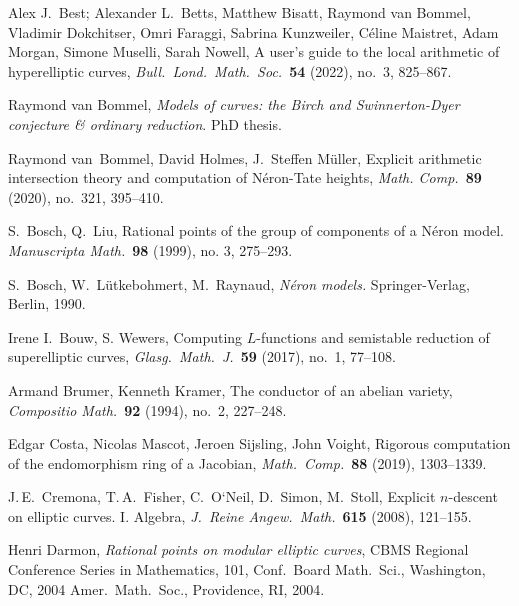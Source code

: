 \documentclass[12pt]{article}
\theoremstyle{definition}
\numberwithin{equation}{subsection}
\begin{document}
\begin{thebibliography}{HyperUser}				%

    Alex J.\ Best; Alexander L.\ Betts, Matthew Bisatt, Raymond van Bommel, Vladimir Dokchitser, Omri Faraggi, Sabrina Kunzweiler, C\'eline Maistret, Adam Morgan, Simone Muselli, Sarah Nowell,
    A user's guide to the local arithmetic of hyperelliptic curves,
    {\em Bull.\ Lond.\ Math.\ Soc.}\ {\bf 54} (2022), no.~3, 825--867.

    Raymond van Bommel,
    {\em Models of curves: the Birch and Swinnerton-Dyer conjecture \& ordinary reduction}.
    PhD thesis.

    Raymond van~Bommel, David Holmes, J.\ Steffen M\"uller,
    Explicit arithmetic intersection theory and computation of N\'eron-Tate heights,
    {\em Math. Comp.}\ {\bf 89} (2020), no.~321, 395--410.

	S.\ Bosch, Q.\ Liu, 
	Rational points of the group of components of a N\'eron model.
	{\em Manuscripta Math.}\ {\bf 98} (1999), no. 3, 275--293.

	S.\ Bosch, W.\, L\"utkebohmert, M.\ Raynaud,
	\emph{N\'eron models.}
	Springer-Verlag, Berlin, 1990.

    Irene I.\ Bouw, S. Wewers,
    Computing $L$-functions and semistable reduction of superelliptic curves,
    {\em Glasg.\ Math.\ J.}\ {\bf 59} (2017), no.~1, 77--108.

    Armand Brumer, Kenneth Kramer,
    The conductor of an abelian variety,
    {\em Compositio Math.}\ {\bf 92} (1994), no.~2, 227--248.

    Edgar Costa, Nicolas Mascot, Jeroen Sijsling, John Voight,
    Rigorous computation of the endomorphism ring of a Jacobian,
    {\em Math.\ Comp.}\ {\bf 88} (2019), 1303--1339.

    J.\,E.\ Cremona, T.\,A.\ Fisher, C.\ O`Neil, D.\ Simon, M.\ Stoll,
    Explicit $n$-descent on elliptic curves. I. Algebra,
    {\em J.\ Reine Angew.\ Math.}\ {\bf 615} (2008), 121--155.

    Henri Darmon,
    {\it Rational points on modular elliptic curves},
    CBMS Regional Conference Series in Mathematics, 101, Conf.\ Board Math.\ Sci., Washington, DC, 2004 Amer.\ Math.\ Soc., Providence, RI, 2004.


\end{thebibliography}
\end{document}
